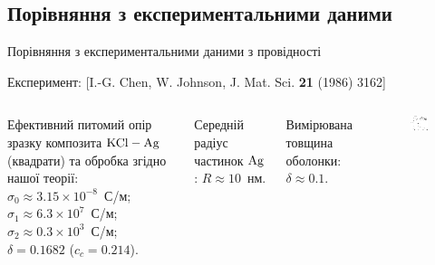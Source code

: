 \documentclass[10pt]{beamer}
\begin{document}
\subsection{Порівняння з експериментальними даними}
\begin{frame}{Порівняння з експериментальними даними з провідності}

    \scriptsize{Експеримент: [I.-G. Chen, W. Johnson, J. Mat. Sci. {\bf 21} (1986) 3162]}
    
\footnotesize
\begin{columns}[T,onlytextwidth]
    \vspace{10pt}
      Ефективний питомий опір зразку композита $\rm KCl-Ag$ (квадрати) та обробка згідно нашої теорії: \\
      $\sigma_0 \approx 3.15 \times 10^{-8}$~С/м; \\
      $\sigma_1 \approx 6.3 \times 10^7$~С/м; 
      $\sigma_2 \approx 0.3 \times 10^3$~С/м; \\
      $\delta = 0.1682$ ($c_c = 0.214$).

      \vspace{5pt}
      Середній радіус частинок $\rm Ag$: $R\approx 10$~нм. 
      
      Вимірювана товщина оболонки: $\delta \approx 0.1$.

      \begin{figure}
        \centering
        \includegraphics[width=0.99\textwidth]{images/grannan-sigma-fin.eps}
      \end{figure}
\end{columns}

\end{frame}
\end{document}
